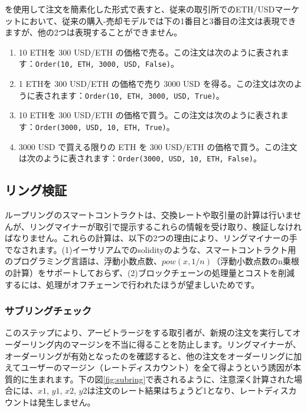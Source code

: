 \documentclass{article}
\begin{document}
\begin{multicols}{2}
を使用して注文を簡素化した形式で表すと、従来の取引所でのETH/USDマーケットにおいて、従来の購入-売却モデルでは下の1番目と3番目の注文は表現できますが、他の2つは表現することができません。

\begin{enumerate}
	\item 10 ETHを 300 USD/ETH の価格で売る。この注文は次のように表されます：\verb|Order(10, ETH, 3000, USD, False)|。
	\item 1 ETHを 300 USD/ETH の価格で売り 3000 USD を得る。この注文は次のように表されます：\verb|Order(10, ETH, 3000, USD, True)|。
	\item 10 ETHを 300 USD/ETH の価格で買う。この注文は次のように表されます：\verb|Order(3000, USD, 10, ETH, True)|。
	\item 3000 USD で買える限りの ETH を 300 USD/ETH の価格で買う。この注文は次のように表されます：\verb|Order(3000, USD, 10, ETH, False)|。
\end{enumerate}



\subsection{リング検証\label{sec:ring_verification}}

ループリングのスマートコントラクトは、交換レートや取引量の計算は行いませんが、リングマイナーが取引で提示するこれらの情報を受け取り、検証しなければなりません。これらの計算は、以下の2つの理由により、リングマイナーの手でなされます。(1)イーサリアムでのsolidity\cite{dannen2017introducing}のような、スマートコントラクト用のプログラミング言語は、浮動小数点数、$pow(x, 1/n)$（浮動小数点数のn乗根の計算）をサポートしておらず、(2)ブロックチェーンの処理量とコストを削減するには、処理がオフチェーンで行われたほうが望ましいためです。


\subsubsection{サブリングチェック\label{sec:sub_ring_check}}
このステップにより、アービトラージをする取引者が、新規の注文を実行してオーダーリング内のマージンを不当に得ることを防止します。リングマイナーが、オーダーリングが有効となったのを確認すると、他の注文をオーダーリングに加えてユーザーのマージン（レートディスカウント）を全て得ようという誘因が本質的に生まれます。下の図\ref{fig:subring}で表されるように、注意深く計算された場合には、$x1$, $y1$, $x2$, $y2$は注文のレート結果はちょうど1となり、レートディスカウントは発生しません。


\end{multicols}
\end{document}
